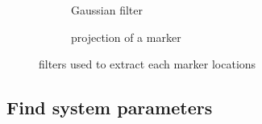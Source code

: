 \begin{figure}
	\centering
	\begin{subfigure}[b]{0.3\linewidth}
	\centering
	\label{fig:GaussianFilter}
	\caption{Gaussian filter}
	\end{subfigure}
\hspace{0.2cm}
	\begin{subfigure}[b]{0.3\linewidth}
	\centering
	\label{fig:markercluster}
	\caption{projection of a marker}
	\end{subfigure}
\label{fig:extractmarkerlocation}
\caption{filters used to extract each marker locations}
\end{figure}

\subsection{Find system parameters}
